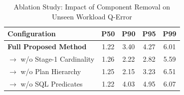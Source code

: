 \begin{table}[t]
\centering
\caption{Ablation Study: Impact of Component Removal on Unseen Workload Q-Error}
\label{tab:ablation}
\begin{tabular}{lcccc}
\hline
\textbf{Configuration} & \textbf{P50} & \textbf{P90} & \textbf{P95} & \textbf{P99} \\
\hline
\textbf{Full Proposed Method} & 1.22 & 3.40 & 4.27 & 6.01 \\
$\rightarrow$ w/o Stage-1 Cardinality & 1.26 & 2.22 & 2.82 & 5.59 \\
$\rightarrow$ w/o Plan Hierarchy & 1.25 & 2.15 & 3.23 & 6.51 \\
$\rightarrow$ w/o SQL Predicates & 1.22 & 4.03 & 4.95 & 6.07 \\
\hline
\end{tabular}
\end{table}